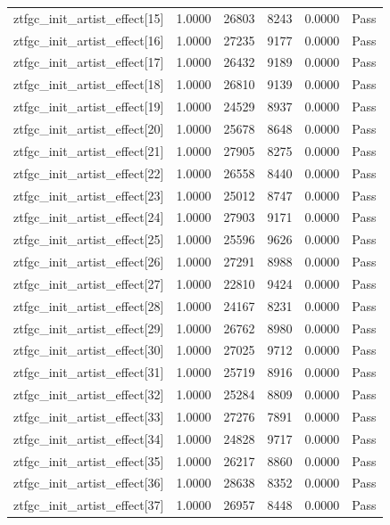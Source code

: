 \begin{table}[htbp]
\begin{tabular}{llrrll}
ztfgc\_init\_artist\_effect[15] & 1.0000 & 26803 & 8243 & 0.0000 & Pass \\
ztfgc\_init\_artist\_effect[16] & 1.0000 & 27235 & 9177 & 0.0000 & Pass \\
ztfgc\_init\_artist\_effect[17] & 1.0000 & 26432 & 9189 & 0.0000 & Pass \\
ztfgc\_init\_artist\_effect[18] & 1.0000 & 26810 & 9139 & 0.0000 & Pass \\
ztfgc\_init\_artist\_effect[19] & 1.0000 & 24529 & 8937 & 0.0000 & Pass \\
ztfgc\_init\_artist\_effect[20] & 1.0000 & 25678 & 8648 & 0.0000 & Pass \\
ztfgc\_init\_artist\_effect[21] & 1.0000 & 27905 & 8275 & 0.0000 & Pass \\
ztfgc\_init\_artist\_effect[22] & 1.0000 & 26558 & 8440 & 0.0000 & Pass \\
ztfgc\_init\_artist\_effect[23] & 1.0000 & 25012 & 8747 & 0.0000 & Pass \\
ztfgc\_init\_artist\_effect[24] & 1.0000 & 27903 & 9171 & 0.0000 & Pass \\
ztfgc\_init\_artist\_effect[25] & 1.0000 & 25596 & 9626 & 0.0000 & Pass \\
ztfgc\_init\_artist\_effect[26] & 1.0000 & 27291 & 8988 & 0.0000 & Pass \\
ztfgc\_init\_artist\_effect[27] & 1.0000 & 22810 & 9424 & 0.0000 & Pass \\
ztfgc\_init\_artist\_effect[28] & 1.0000 & 24167 & 8231 & 0.0000 & Pass \\
ztfgc\_init\_artist\_effect[29] & 1.0000 & 26762 & 8980 & 0.0000 & Pass \\
ztfgc\_init\_artist\_effect[30] & 1.0000 & 27025 & 9712 & 0.0000 & Pass \\
ztfgc\_init\_artist\_effect[31] & 1.0000 & 25719 & 8916 & 0.0000 & Pass \\
ztfgc\_init\_artist\_effect[32] & 1.0000 & 25284 & 8809 & 0.0000 & Pass \\
ztfgc\_init\_artist\_effect[33] & 1.0000 & 27276 & 7891 & 0.0000 & Pass \\
ztfgc\_init\_artist\_effect[34] & 1.0000 & 24828 & 9717 & 0.0000 & Pass \\
ztfgc\_init\_artist\_effect[35] & 1.0000 & 26217 & 8860 & 0.0000 & Pass \\
ztfgc\_init\_artist\_effect[36] & 1.0000 & 28638 & 8352 & 0.0000 & Pass \\
ztfgc\_init\_artist\_effect[37] & 1.0000 & 26957 & 8448 & 0.0000 & Pass \\

\end{tabular}
\end{table}
